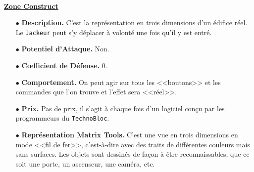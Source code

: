 \documentclass[11pt,twoside,a4paper]{article}
\begin{document}
\begin{multicols*}{2}
\vfill ~\\
\columnbreak

\underline{\textbf{Zone Construct}} %
\begin{itemize}
	\item[$\bullet$] \textbf{Description. }C'est la repr{\'e}sentation en trois dimensions d'un {\'e}difice r{\'e}el. Le \texttt{Jackeur} peut s'y d{\'e}placer {\`a} volont{\'e} une fois qu'il y est entr{\'e}. 
	\item[$\bullet$] \textbf{Potentiel d'Attaque. }Non. 
	\item[$\bullet$] \textbf{C\oe fficient de D{\'e}fense. }0. 
	\item[$\bullet$] \textbf{Comportement. }On peut agir sur tous les <<boutons>> et les commandes que l'on trouve et l'effet sera <<r{\'e}el>>. 
	\item[$\bullet$] \textbf{Prix. }Pas de prix, il s'agit {\`a} chaque fois d'un logiciel con\c{c}u par les programmeurs du \texttt{TechnoBloc}. 
	\item[$\bullet$] \textbf{Repr{\'e}sentation Matrix Tools. }C'est une vue en trois dimensions en mode <<fil de fer>>, c'est-{\`a}-dire avec des traits de diff{\'e}rentes couleurs mais sans surfaces. Les objets sont dessin{\'e}s de fa\c{c}on {\`a} {\^e}tre reconnaissables, que ce soit une porte, un ascenseur, une cam{\'e}ra, etc. 
\end{itemize} %


\end{multicols*}
\end{document}
